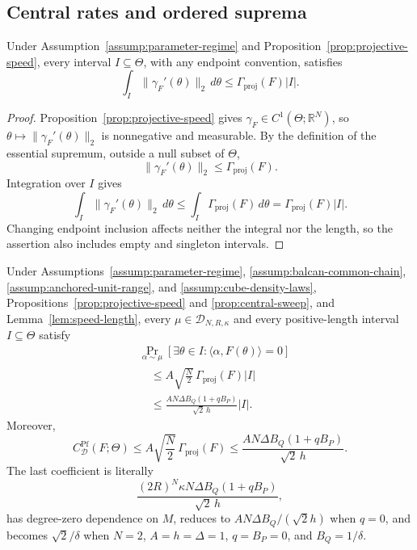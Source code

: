 \subsection{Central rates and ordered suprema}
\label{app:central-rate}

\begin{lemma}
\label{lem:speed-length}
Under Assumption~\ref{assump:parameter-regime} and
Proposition~\ref{prop:projective-speed}, every interval
$I\subseteq\Theta$, with any endpoint convention, satisfies
\begin{equation}
\int_I\|\gamma_F'(\theta)\|_2\,d\theta
\leq\Gamma_{\mathrm{proj}}(F)|I|.
\label{eq:appendix-14}
\end{equation}
\end{lemma}

\begin{proof}
Proposition~\ref{prop:projective-speed} gives
$\gamma_F\in C^1(\Theta;\mathbb R^N)$, so
$\theta\mapsto\|\gamma_F'(\theta)\|_2$ is nonnegative and measurable.  By
the definition of the essential supremum, outside a null subset of $\Theta$,
\[
\|\gamma_F'(\theta)\|_2\leq\Gamma_{\mathrm{proj}}(F).
\]
Integration over $I$ gives
\[
\int_I\|\gamma_F'(\theta)\|_2\,d\theta
\leq\int_I\Gamma_{\mathrm{proj}}(F)\,d\theta
=\Gamma_{\mathrm{proj}}(F)|I|.
\]
Changing endpoint inclusion affects neither the integral nor the length, so
the assertion also includes empty and singleton intervals.
\end{proof}

\begin{proposition}
\label{prop:central-rate}
Under Assumptions~\ref{assump:parameter-regime},
\ref{assump:balcan-common-chain},
\ref{assump:anchored-unit-range}, and
\ref{assump:cube-density-laws}, Propositions~\ref{prop:projective-speed} and
\ref{prop:central-sweep}, and Lemma~\ref{lem:speed-length}, every
$\mu\in\mathcal D_{N,R,\kappa}$ and every positive-length interval
$I\subseteq\Theta$ satisfy
\begin{equation}
\begin{aligned}
&\Pr_{\alpha\sim\mu}
[\exists\theta\in I:\langle\alpha,F(\theta)\rangle=0]\\
&\quad\leq A\sqrt{\frac N2}\,\Gamma_{\mathrm{proj}}(F)|I|\\
&\quad\leq
\frac{AN\Delta B_Q(1+qB_P)}{\sqrt2\,h}|I|.
\end{aligned}
\label{eq:appendix-15}
\end{equation}
Moreover,
\begin{equation}
C^{\mathrm{Pf}}_{\mathcal D}(F;\Theta)
\leq A\sqrt{\frac N2}\,\Gamma_{\mathrm{proj}}(F)
\leq\frac{AN\Delta B_Q(1+qB_P)}{\sqrt2\,h}.
\label{eq:appendix-16}
\end{equation}
The last coefficient is literally
\begin{equation}
\frac{(2R)^N\kappa N\Delta B_Q(1+qB_P)}{\sqrt2\,h},
\label{eq:appendix-17}
\end{equation}
has degree-zero dependence on $M$, reduces to
$AN\Delta B_Q/(\sqrt2 h)$ when $q=0$, and becomes
$\sqrt2/\delta$ when
$N=2$, $A=h=\Delta=1$, $q=B_P=0$, and $B_Q=1/\delta$.
\end{proposition}

